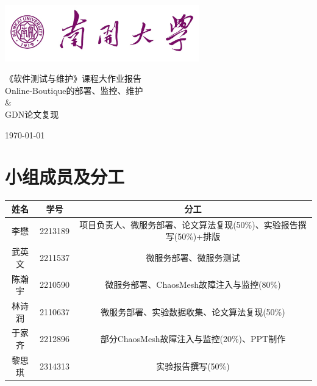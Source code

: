 \documentclass[hyperref,a4paper,UTF8]{ctexart}
\begin{document}
\begin{titlepage}
    \begin{center}
        \vspace*{2.0cm}
        \includegraphics[width=0.63\textwidth]{figures/南开logo.jpg}
        
        \vspace{4cm}
        \fontsize{28}{36}\selectfont
        {\heiti 《软件测试与维护》课程大作业报告} \\[0.5em]
        \fontsize{24}{26}\selectfont
        {\heiti Online-Boutique的部署、监控、维护\\ \& \\GDN论文复现}

        \vfill
        {\Large \today}
    \end{center}
\end{titlepage}


\newpage
\tableofcontents

\newpage
\section{小组成员及分工}
\begin{table}[h!]
    \centering
    \begin{tabular}{|c|c|c|}
        \hline
        姓名 & 学号 & 分工 \\ 
        \hline
        李懋   & 2213189   & 项目负责人、微服务部署、论文算法复现(50\%)、实验报告撰写(50\%)+排版  \\ 
        \hline
        武英文   & 2211537   & 微服务部署、微服务测试   \\ 
        \hline
        陈瀚宇   & 2210590   & 微服务部署、ChaosMesh故障注入与监控(80\%)   \\ 
        \hline
        林诗润   & 2110637   & 微服务部署、实验数据收集、论文算法复现(50\%)   \\
        \hline
        于家齐   & 2212896   & 部分ChaosMesh故障注入与监控(20\%)、PPT制作   \\
        \hline
        黎思琪   & 2314313   & 实验报告撰写(50\%)   \\
        \hline
    \end{tabular}
    \label{tab:example_table}
\end{table}
\end{document}
